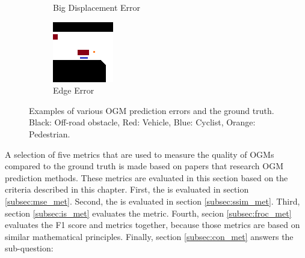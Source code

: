 \begin{figure}[h]
\begin{subfigure}[t]{0.25\linewidth}
		\caption{Big Displacement Error}
		\label{fig:met_crit_bdisp}
	\end{subfigure} \hfil
	\begin{subfigure}[t]{0.25\linewidth}
		\includegraphics[width=\linewidth]{Figures/Res_Prop/Edge_colloquium}
		\caption{Edge Error}
		\label{fig:met_crit_edge}
	\end{subfigure} \hfil
	\caption{Examples of various \gls{OGM} prediction errors and the ground truth. Black: Off-road obstacle, Red: Vehicle, Blue: Cyclist, Orange: Pedestrian.}
	\label{fig:met_crit}
\end{figure}

A selection of five metrics that are used to measure the quality of \glspl{OGM} compared to the ground truth is made based on papers that research \gls{OGM} prediction methods. These metrics are evaluated in this section based on the criteria described in this chapter. First, the  is evaluated in section \ref{subsec:mse_met}. Second, the  is evaluated in section \ref{subsec:ssim_met}. Third, section \ref{subsec:is_met} evaluates the  metric. Fourth, secion \ref{subsec:froc_met} evaluates the F1 score and  metrics together, because those metrics are based on similar mathematical principles. Finally, section \ref{subsec:con_met} answers the sub-question: 

